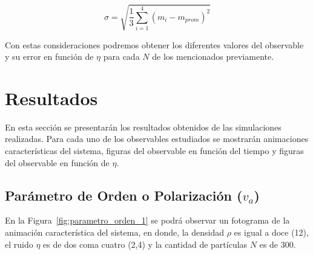 \documentclass[11pt, a4paper]{article}
\begin{document}
            \begin{equation}
                \sigma = \sqrt{\frac{1}{3} \sum_{i=1}^{4} (m_i - m_{prom})^2}
            \end{equation}

            Con estas consideraciones podremos obtener los diferentes valores del observable y su error en función de $\eta$
            para cada $N$ de los mencionados previamente.

    \newpage

    \section{Resultados}
    \label{sec:resultados}

        En esta sección se presentarán los resultados obtenidos de las simulaciones realizadas.
        Para cada uno de los observables estudiados se mostrarán animaciones características del sistema,
        figuras del observable en función del tiempo y figuras del observable en función de $\eta$.

        \subsection{Parámetro de Orden o Polarización ($v_a$)}
        \label{subsec:resultados-polarizacion}

            En la Figura~\ref{fig:parametro_orden_1} se podrá observar un fotograma de la animación característica del sistema, en donde,
            la densidad $\rho$ es igual a doce (12), el ruido $\eta$ es de dos coma cuatro (2,4) y la cantidad de partículas $N$ es de 300.
\end{document}
